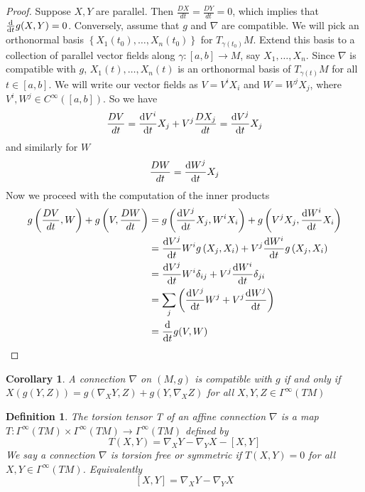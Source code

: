 \documentclass[a4paper]{article}
\newtheorem*{defn}{Definition}
\newtheorem*{cor}{Corollary}
\begin{document}
\begin{proof}
  Suppose $X,Y$ are parallel.  Then $\frac{DX}{dt} = \frac{DY}{dt} = 0$, which implies that $\dv{t} g(X,Y) = 0$. Conversely, assume that $g$ and $\nabla$ are compatible. We will pick an orthonormal basis $\left\{ X_1(t_0), \dots, X_n(t_0) \right\}$ for $T_{\gamma(t_0)}M$. Extend this basis to a collection of parallel vector fields along $\gamma: [a,b] \rightarrow M$, say $X_1, \dots, X_n$. Since $\nabla$ is compatible with $g$, $X_1(t), \dots, X_n(t)$ is an orthonormal basis of $T_{\gamma(t)}M$ for all $t \in [a,b]$. We will write our vector fields as $V = V^iX_i$ and $W = W^jX_j$, where $V^i, W^j \in C^{\infty}([a,b])$. So we have
  \[
    \frac{DV}{dt} = \dv{V^i}{t}X_j + V^j \frac{DX_j}{dt} = \dv{V^j}{t}X_j
  \]
  and similarly for $W$
  \[
    \frac{DW}{dt} = \dv{W^j}{t}X_j
  \]
  Now we proceed with the computation of the inner products
  \[
    \begin{aligned}
      g \left( \frac{DV}{dt}, W \right) + g \left( V, \frac{DW}{dt} \right) &= g \left( \dv{V^j}{t} X_j, W^iX_i \right) + g \left( V^jX_j, \dv{W^i}{t} X_i \right) \\
                                                                            &= \dv{V^j}{t}W^ig \left(X_j, X_i \right) + V^j \dv{W^i}{t}g \left(X_j, X_i \right) \\
                                                                            &= \dv{V^j}{t}W^i\delta_{ij}+ V^j \dv{W^i}{t}\delta_{ji} \\
                                                                            &= \sum_j \left( \dv{V^j}{t} W^j + V^j \dv{W^j}{t} \right) \\
                                                                            &= \dv{t} g(V,W)
    \end{aligned}
  \]
\end{proof}

\begin{cor}
  A connection $\nabla$ on $(M,g)$ is compatible with $g$ if and only if $X(g(Y,Z)) = g(\nabla_X Y, Z) + g(Y, \nabla_X Z)$ for all $X,Y,Z \in \Gamma^{\infty}(TM)$
\end{cor}

\begin{defn}
  The torsion tensor T of an affine connection $\nabla$ is a map $T: \Gamma^{\infty}(TM) \times \Gamma^{\infty}(TM)  \rightarrow \Gamma^{\infty}(TM)$ defined by 
  \[
    T(X,Y) =  \nabla_X Y - \nabla_Y X - [X,Y]
  \]
  We say a connection $\nabla$ is torsion free or symmetric if $T(X,Y) = 0$ for all $X,Y \in \Gamma^{\infty}(TM)$. Equivalently 
  \[
    [X,Y] = \nabla_X Y - \nabla_Y X
  \]
\end{defn}
\end{document}
